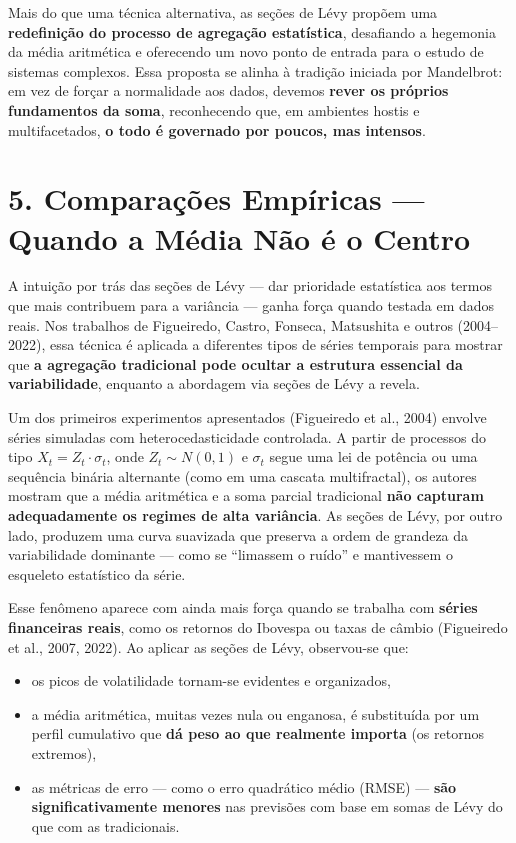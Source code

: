 \documentclass[
]{agujournal2019}
\providecommand{\tightlist}{%
  \setlength{\itemsep}{0pt}\setlength{\parskip}{0pt}}\usepackage{longtable,booktabs,array}
\begin{document}
Mais do que uma técnica alternativa, as seções de Lévy propõem uma
\textbf{redefinição do processo de agregação estatística}, desafiando a
hegemonia da média aritmética e oferecendo um novo ponto de entrada para
o estudo de sistemas complexos. Essa proposta se alinha à tradição
iniciada por Mandelbrot: em vez de forçar a normalidade aos dados,
devemos \textbf{rever os próprios fundamentos da soma}, reconhecendo
que, em ambientes hostis e multifacetados, \textbf{o todo é governado
por poucos, mas intensos}.

\section{5. Comparações Empíricas --- Quando a Média Não é o
Centro}\label{comparauxe7uxf5es-empuxedricas-quando-a-muxe9dia-nuxe3o-uxe9-o-centro}

A intuição por trás das seções de Lévy --- dar prioridade estatística
aos termos que mais contribuem para a variância --- ganha força quando
testada em dados reais. Nos trabalhos de Figueiredo, Castro, Fonseca,
Matsushita e outros (2004--2022), essa técnica é aplicada a diferentes
tipos de séries temporais para mostrar que \textbf{a agregação
tradicional pode ocultar a estrutura essencial da variabilidade},
enquanto a abordagem via seções de Lévy a revela.

Um dos primeiros experimentos apresentados (Figueiredo et al., 2004)
envolve séries simuladas com heterocedasticidade controlada. A partir de
processos do tipo \(X_t = Z_t \cdot \sigma_t\), onde \(Z_t \sim N(0,1)\)
e \(\sigma_t\) segue uma lei de potência ou uma sequência binária
alternante (como em uma cascata multifractal), os autores mostram que a
média aritmética e a soma parcial tradicional \textbf{não capturam
adequadamente os regimes de alta variância}. As seções de Lévy, por
outro lado, produzem uma curva suavizada que preserva a ordem de
grandeza da variabilidade dominante --- como se ``limassem o ruído'' e
mantivessem o esqueleto estatístico da série.

Esse fenômeno aparece com ainda mais força quando se trabalha com
\textbf{séries financeiras reais}, como os retornos do Ibovespa ou taxas
de câmbio (Figueiredo et al., 2007, 2022). Ao aplicar as seções de Lévy,
observou-se que:

\begin{itemize}
\tightlist
\item
  os picos de volatilidade tornam-se evidentes e organizados,
\item
  a média aritmética, muitas vezes nula ou enganosa, é substituída por
  um perfil cumulativo que \textbf{dá peso ao que realmente importa} (os
  retornos extremos),
\item
  as métricas de erro --- como o erro quadrático médio (RMSE) ---
  \textbf{são significativamente menores} nas previsões com base em
  somas de Lévy do que com as tradicionais.
\end{itemize}
\end{document}

